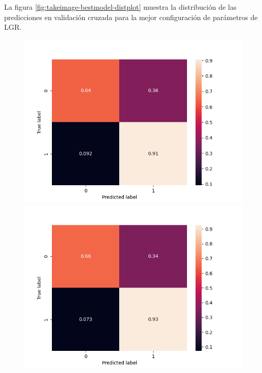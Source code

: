 La figura \ref{fig:takeimage-bestmodel-distplot} muestra la distribución de las
predicciones en validación cruzada para la mejor configuración de parámetros de
LGR.


\begin{figure}[b!]
    \includegraphics[width=\linewidth]{figures/results/word_embeddings/lgr/take_image/lgr_set_1_confusion_matrix_percent.png}
    \endminipage
    \includegraphics[width=\linewidth]{figures/results/word_embeddings/lgr/take_image/lgr_set_2_confusion_matrix_percent.png}
    \endminipage
        

\end{figure}
